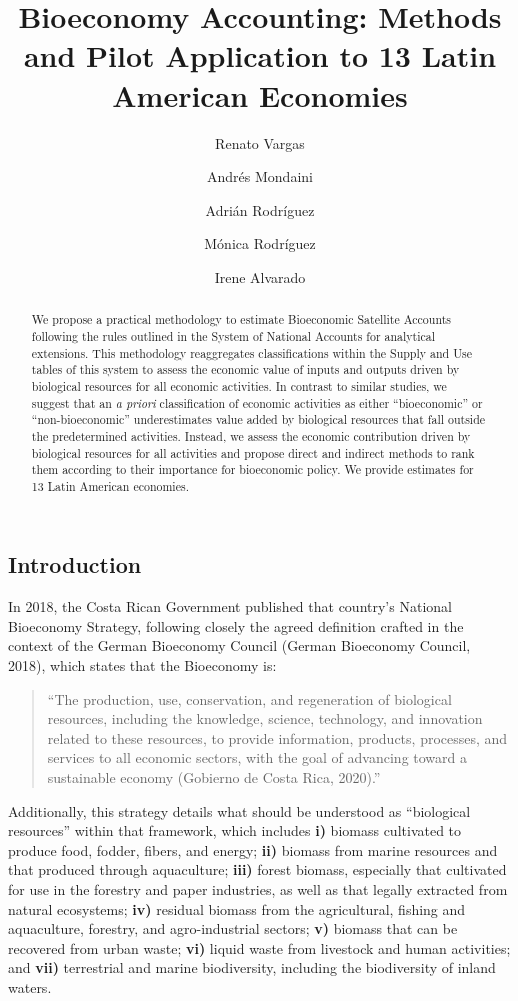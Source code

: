 \documentclass[
  letterpaper,
  DIV=11,
  numbers=noendperiod]{scrartcl}
\title{Bioeconomy Accounting: Methods and Pilot Application to 13 Latin
American Economies}
\author{Renato Vargas \and Andrés Mondaini \and Adrián
Rodríguez \and Mónica Rodríguez \and Irene Alvarado}
\date{}
\begin{document}
\maketitle
\begin{abstract}
We propose a practical methodology to estimate Bioeconomic Satellite
Accounts following the rules outlined in the System of National Accounts
for analytical extensions. This methodology reaggregates classifications
within the Supply and Use tables of this system to assess the economic
value of inputs and outputs driven by biological resources for all
economic activities. In contrast to similar studies, we suggest that an
\emph{a priori} classification of economic activities as either
``bioeconomic'' or ``non-bioeconomic'' underestimates value added by
biological resources that fall outside the predetermined activities.
Instead, we assess the economic contribution driven by biological
resources for all activities and propose direct and indirect methods to
rank them according to their importance for bioeconomic policy. We
provide estimates for 13 Latin American economies.
\end{abstract}

\subsection{Introduction}\label{introduction}

In 2018, the Costa Rican Government published that country's National
Bioeconomy Strategy, following closely the agreed definition crafted in
the context of the German Bioeconomy Council (German Bioeconomy Council,
2018), which states that the Bioeconomy is:

\begin{quote}
``The production, use, conservation, and regeneration of biological
resources, including the knowledge, science, technology, and innovation
related to these resources, to provide information, products, processes,
and services to all economic sectors, with the goal of advancing toward
a sustainable economy (Gobierno de Costa Rica, 2020).''
\end{quote}

Additionally, this strategy details what should be understood as
``biological resources'' within that framework, which includes
\textbf{i)} biomass cultivated to produce food, fodder, fibers, and
energy; \textbf{ii)} biomass from marine resources and that produced
through aquaculture; \textbf{iii)} forest biomass, especially that
cultivated for use in the forestry and paper industries, as well as that
legally extracted from natural ecosystems; \textbf{iv)} residual biomass
from the agricultural, fishing and aquaculture, forestry, and
agro-industrial sectors; \textbf{v)} biomass that can be recovered from
urban waste; \textbf{vi)} liquid waste from livestock and human
activities; and \textbf{vii)} terrestrial and marine biodiversity,
including the biodiversity of inland waters.
\end{document}

